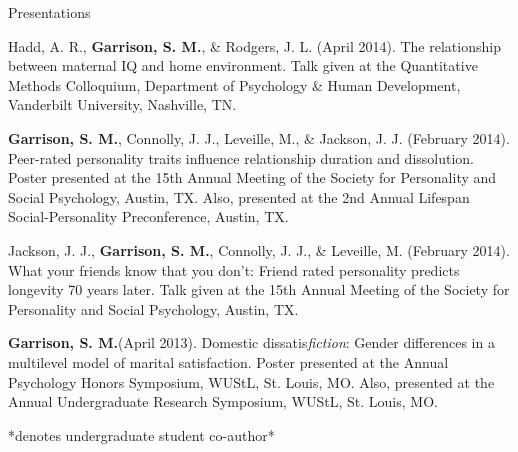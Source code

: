 \documentclass {resume}
\newlength{\wideitemsep}
\let\olditem\item
\renewcommand{\item}{\setlength{\itemsep}{\wideitemsep}\olditem}
\newcommand{\meb}{{\bf Garrison, S. M.}\xspace}
\begin{document}
\begin{rSection}{\textrm{Presentations}}
\begin{etaremune}
\item Hadd, A. R., \meb, \& Rodgers, J. L. (April 2014). The relationship between maternal IQ and home environment. Talk given at the Quantitative Methods Colloquium, Department of Psychology \& Human Development, Vanderbilt University, Nashville, TN.%
\item\meb, Connolly, J. J., Leveille, M., \& Jackson, J. J. (February 2014). Peer-rated personality traits influence relationship duration and dissolution. Poster presented at the 15th Annual Meeting of the Society for Personality and Social Psychology, Austin, TX. Also, presented at the 2nd Annual Lifespan Social-Personality  Preconference, Austin, TX.
\item Jackson, J. J., \textbf{Garrison, S. M.}, Connolly, J. J., \& Leveille, M. (February 2014). What your friends know that you don't: Friend rated personality predicts longevity 70 years later. Talk given at the 15th Annual Meeting of the Society for Personality and  Social Psychology, Austin, TX.
\item\meb (April 2013). Domestic dissatis{\em fiction}: Gender differences in a multilevel model of marital satisfaction. Poster presented at the Annual Psychology Honors Symposium, WUStL, St. Louis, MO. Also, presented at the Annual Undergraduate Research Symposium, WUStL, St. Louis, MO.
\end{etaremune}\vspace{-3mm}\begin{center}\footnotesize{*denotes undergraduate student co-author*}\end{center} \vspace{-3mm}%
\end{rSection}
\pagestyle{myheadings}
\end{document}
